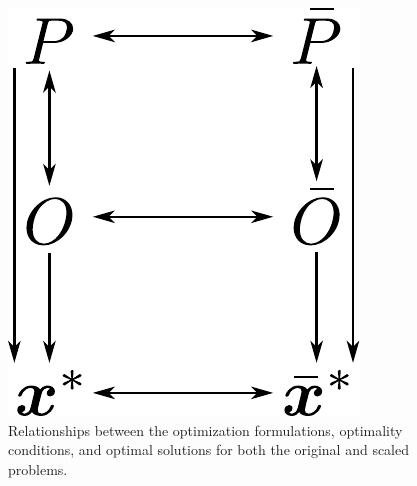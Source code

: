 \begin{figure}[t]
\centering
\includegraphics[width=0.2\columnwidth]{../ch4/figures/map}
\caption[Relationships between the original and scaled problems]{Relationships between the optimization formulations, optimality conditions, and optimal solutions for both the original and scaled problems. \label{fig:ch4:map}}
\end{figure}